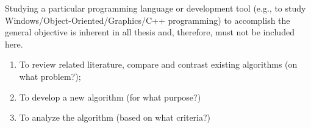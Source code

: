 Studying a particular programming language or development tool (e.g., to study Windows/Object-Oriented/Graphics/C++ programming) to  accomplish the general objective is inherent in all thesis and, therefore, must not be included here.


\begin{comment}
How to formulate your research objectives:
1. Identify what research steps do you need to perform to achieve your general objective.
2. Identify the questions that must be answered for you to achieve your general objective.
    Thereafter, convert these questions into action statements

Example #1:

Research Question:
  What are the general features of a web-based learning environment?

Specific Objective:
   To review existing web-based learning environment that teaches language learning for children


Example #2:

Research Question:
   How will you represent commonsense knowledge for use by computer systems?

Specific Objective:
   To identify knowledge representation approaches used by existing story generation systems

Example #3:
Research Question:
   What types of storytelling knowledge are needed to generate stories?

Specific Objective:
    To identify the different types of storytelling knowledge used in generating stories

Example #4:
Research Question:
    What machine learning approaches will you utilize?

Specific Objective:
    To determine existing machine learning algorithms [that can be used in training the computer system to detect cyberbullying cases] 

Example #5: Research Question:
    How will your research output be evaluated?

Specific Objective:
    To define evaluation metrics for validating the accuracy of the translation

\end{comment}

%
%

\begin{enumerate}
   \item To review related literature, compare and contrast existing algorithms (on what problem?);
   \item To develop a new algorithm (for what purpose?)
   \item To analyze the algorithm (based on what criteria?)
\end{enumerate}


